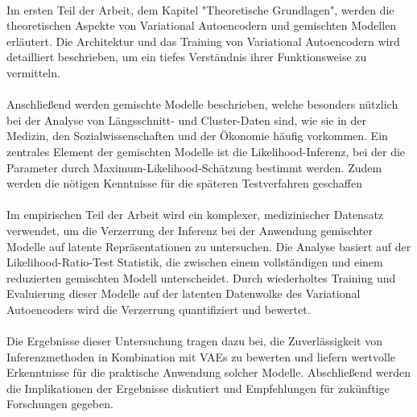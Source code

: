 \documentclass[%
thesis=student,%
coverpage=false,%
titlepage=false,%
headmarks=true, %
german,%
font=libertine, %
math=newpxtx, %
BCOR=5mm,%
coverBCOR=11mm%
]{tumbook}
\theoremstyle{break}
\begin{document}
\\
Im ersten Teil der Arbeit, dem Kapitel "Theoretische Grundlagen",  werden die theoretischen Aspekte von Variational Autoencodern  und gemischten Modellen erläutert. Die Architektur und das Training von Variational Autoencodern wird detailliert beschrieben, um ein tiefes Verständnis ihrer Funktionsweise zu vermitteln.\\
\\
Anschließend werden gemischte Modelle beschrieben, welche besonders nützlich bei der Analyse von Längsschnitt- und Cluster-Daten sind, wie sie in der Medizin, den Sozialwissenschaften und der Ökonomie häufig vorkommen. Ein zentrales Element der gemischten Modelle ist die Likelihood-Inferenz, bei der die Parameter durch Maximum-Likelihood-Schätzung bestimmt werden. Zudem werden die nötigen Kenntnisse für die späteren Testverfahren geschaffen \\
\\
Im empirischen Teil der Arbeit wird ein komplexer,  medizinischer Datensatz verwendet, um die Verzerrung der Inferenz bei der Anwendung gemischter Modelle auf latente Repräsentationen zu untersuchen. Die Analyse basiert auf der Likelihood-Ratio-Test Statistik, die zwischen einem vollständigen und einem reduzierten gemischten Modell unterscheidet. Durch wiederholtes Training und Evaluierung dieser Modelle auf der latenten Datenwolke des Variational Autoencoders wird die Verzerrung quantifiziert und bewertet.\\
\\
Die Ergebnisse dieser Untersuchung tragen dazu bei, die Zuverlässigkeit von Inferenzmethoden in Kombination mit VAEs zu bewerten und liefern wertvolle Erkenntnisse für die praktische Anwendung solcher Modelle. Abschließend werden die Implikationen der Ergebnisse diskutiert und Empfehlungen für zukünftige Forschungen gegeben.\\
\\

\end{document}
